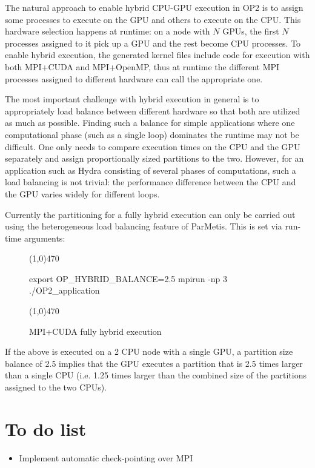 \documentclass[11pt]{article}
\begin{document}
The natural approach to enable hybrid CPU-GPU execution in OP2 is to assign some processes to execute on the GPU
and others to execute on the CPU. This hardware selection happens at runtime: on a node with $N$ GPUs, the first $N$
processes assigned to it pick up a GPU and the rest become CPU processes. To enable hybrid execution, the generated
kernel files include code for execution with both MPI+CUDA and MPI+OpenMP, thus at runtime the different MPI processes
assigned to different hardware can call the appropriate one.

The most important challenge with hybrid execution in general is to appropriately load balance between different
hardware so that both are utilized as much as possible. Finding such a balance for simple applications where one
computational phase (such as a single loop) dominates the runtime may not be difficult. One only needs to compare
execution times on the CPU and the GPU separately and assign proportionally sized partitions to the two. However, for an
application such as Hydra consisting of several phases of computations, such a load balancing is not trivial: the
performance difference between the CPU and the GPU varies widely for different loops.

Currently the partitioning for a fully hybrid execution can only be carried out using the heterogeneous load balancing
feature of ParMetis. This is set via run-time arguments:

\begin{figure}[h]\small
\vspace{-0pt}\noindent\line(1,0){470}\vspace{-10pt}
\begin{pyglist}[language=bash]
export OP_HYBRID_BALANCE=2.5
mpirun -np 3 ./OP2_application
\end{pyglist}
\vspace{-10pt}\noindent\line(1,0){470}\vspace{-10pt}
\caption{\small MPI+CUDA fully hybrid execution}
\normalsize\vspace{-0pt}\label{fig:hybrid}
\end{figure}

\noindent If the above is executed on a 2 CPU node with a single GPU, a partition size balance of 2.5 implies that the
GPU executes a partition that is 2.5 times larger than a single CPU (i.e. 1.25 times larger than the combined size of
the partitions assigned to the two CPUs).




\section{To do list}
\begin{itemize}
\item Implement automatic check-pointing over MPI
\end{itemize}
\end{document}
